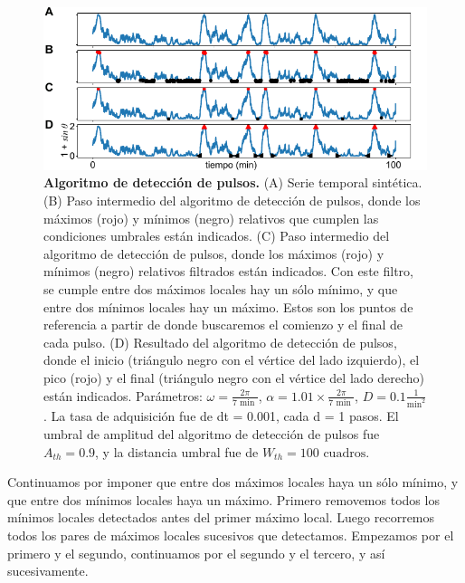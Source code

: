 \documentclass[./main.tex]{subfiles}
\begin{document}
 
 \begin{figure}
    \centering
    \includegraphics[width=1\columnwidth]{figures/chapter6/C6_pulse_detection.pdf} 
    \caption{\textbf{Algoritmo de detección de pulsos.} (A) Serie temporal sintética. (B) Paso intermedio del algoritmo de detección de pulsos, donde los máximos (rojo) y mínimos (negro) relativos que cumplen las condiciones umbrales están indicados. (C)  Paso intermedio del algoritmo de detección de pulsos, donde los máximos (rojo) y mínimos (negro) relativos filtrados están indicados. Con este filtro, se cumple entre dos máximos locales hay un sólo mínimo, y que entre dos mínimos locales hay un máximo. Estos son los puntos de referencia a partir de donde buscaremos el comienzo y el final de cada pulso. (D) Resultado del algoritmo de detección de pulsos, donde el inicio (triángulo negro con el vértice del lado izquierdo), el pico (rojo) y el final (triángulo negro con el vértice del lado derecho) están indicados. Parámetros: $\omega = \frac{2\pi}{7 \text{ min }}$, $\alpha = 1.01 \times \frac{2\pi}{7 \text{ min }}$, $ D = 0.1 \frac{1}{\text{min}^2}$. La tasa de adquisición fue de dt = 0.001, cada d = 1 pasos. El umbral de amplitud del algoritmo de detección de pulsos fue $A_{th} = 0.9$, y la distancia umbral fue de $W_{th} = 100\text{ cuadros}$.} 
    \label{C6_fig:pulse_detection}
\end{figure}
 

Continuamos por imponer que entre dos máximos locales haya un sólo mínimo, y que entre dos mínimos locales haya un máximo. Primero removemos todos los mínimos locales detectados antes del primer máximo local. Luego recorremos todos los pares de máximos locales sucesivos que detectamos. Empezamos por el primero y el segundo, continuamos por el segundo y el tercero, y así sucesivamente. 
\end{document}
